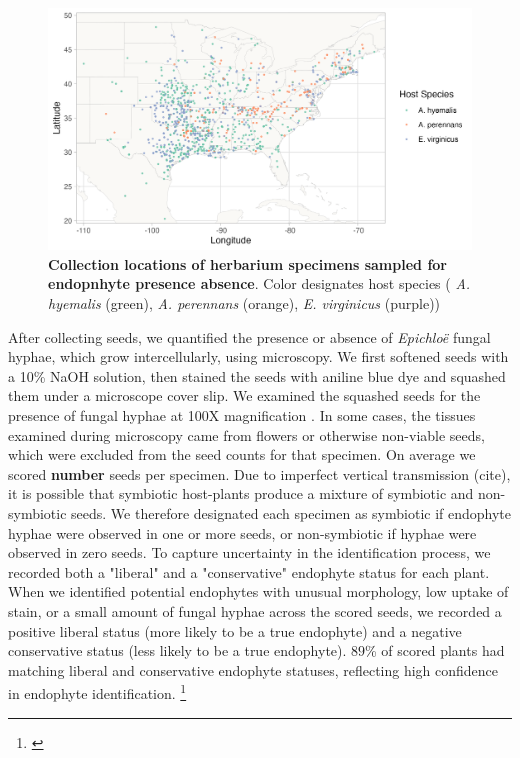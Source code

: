 \documentclass[11pt]{article}
\newcommand{\tom}[2]{{\color{red}{#1}}\footnote{\textit{\color{red}{#2}}}}
\begin{document}
\begin{figure}[H]
	\centering
	\includegraphics[width = \linewidth]{collections_map.png}
	\caption{\textbf{Collection locations of herbarium specimens sampled for endopnhyte presence absence}. Color designates host species ( \emph{A. hyemalis} (green), \emph{A. perennans} (orange), \emph{E. virginicus} (purple))}
\end{figure}


After collecting seeds, we quantified the presence or absence of \emph{Epichloë} fungal hyphae, which grow intercellularly, using microscopy. 
We first softened seeds with a 10\% NaOH solution, then stained the seeds with aniline blue dye and squashed them under a microscope cover slip. 
We examined the squashed seeds for the presence of fungal hyphae at 100X magnification \cite{bacon2018stains}.
In some cases, the tissues examined during microscopy came from flowers or otherwise non-viable seeds, which were excluded from the seed counts for that specimen.
On average we scored \textbf{number} seeds per specimen.
Due to imperfect vertical transmission (cite), it is possible that symbiotic host-plants produce a mixture of symbiotic and non-symbiotic seeds. 
We therefore designated each specimen as symbiotic if endophyte hyphae were observed in one or more seeds, or non-symbiotic if hyphae were observed in zero seeds. 
To capture uncertainty in the identification process, we recorded both a "liberal" and a "conservative" endophyte status for each plant.  
When we identified potential endophytes with unusual morphology, low uptake of stain, or a small amount of fungal hyphae across the scored seeds, we recorded a positive liberal status (more likely to be a true endophyte) and a negative conservative status (less likely to be a true endophyte). 
$89$\% of scored plants had matching liberal and conservative endophyte statuses, reflecting high confidence in endophyte identification.
\tom{The following analyses presented in the main text used the liberal statuses, but we repeated all analyses with the conservative statuses which yielded qualitatively similar results (Appendix). }{Good}
\end{document}
